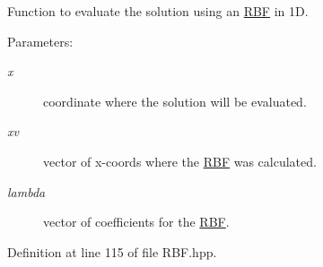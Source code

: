 Function to evaluate the solution using an \hyperlink{namespaceRBF}{RBF} in 1D. 

\begin{Desc}
\item[Parameters:]
\begin{description}
\item[{\em x}]coordinate where the solution will be evaluated. \item[{\em xv}]vector of x-coords where the \hyperlink{namespaceRBF}{RBF} was calculated. \item[{\em lambda}]vector of coefficients for the \hyperlink{namespaceRBF}{RBF}. \end{description}
\end{Desc}


Definition at line 115 of file RBF.hpp.